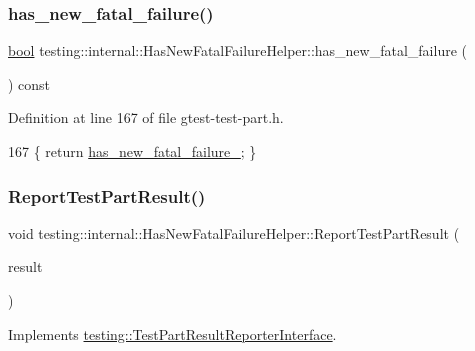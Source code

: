 \subsubsection{\texorpdfstring{has\+\_\+new\+\_\+fatal\+\_\+failure()}{has\_new\_fatal\_failure()}}
{\footnotesize\ttfamily \hyperlink{classbool}{bool} testing\+::internal\+::\+Has\+New\+Fatal\+Failure\+Helper\+::has\+\_\+new\+\_\+fatal\+\_\+failure (\begin{DoxyParamCaption}{ }\end{DoxyParamCaption}) const\hspace{0.3cm}{\ttfamily [inline]}}



Definition at line 167 of file gtest-\/test-\/part.\+h.


\begin{DoxyCode}
167 \{ \textcolor{keywordflow}{return} \hyperlink{classtesting_1_1internal_1_1HasNewFatalFailureHelper_a172103f6aefee8c387a44679888fee30}{has\_new\_fatal\_failure\_}; \}
\end{DoxyCode}
\mbox{\label{classtesting_1_1internal_1_1HasNewFatalFailureHelper_a2d2e1faa1f3669b82810df97ac678a27}} 
\subsubsection{\texorpdfstring{Report\+Test\+Part\+Result()}{ReportTestPartResult()}}
{\footnotesize\ttfamily void testing\+::internal\+::\+Has\+New\+Fatal\+Failure\+Helper\+::\+Report\+Test\+Part\+Result (\begin{DoxyParamCaption}\item[{const \hyperlink{classtesting_1_1TestPartResult}{Test\+Part\+Result} \&}]{result }\end{DoxyParamCaption})\hspace{0.3cm}{\ttfamily [virtual]}}



Implements \hyperlink{classtesting_1_1TestPartResultReporterInterface_aa2f920e7a5a0a6d0faf19e3727928c22}{testing\+::\+Test\+Part\+Result\+Reporter\+Interface}.



